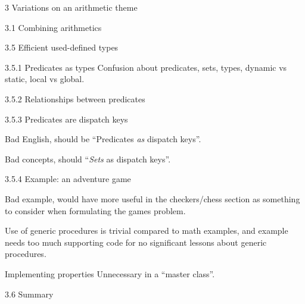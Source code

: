 \documentclass[12pt]{PalisadesLakesBook}
\begin{document}
\begin{plSection}{3 Variations on an arithmetic theme}
\begin{plSection}{3.1 Combining arithmetics}
\begin{plSection}{3.5 Efficient used-defined types}
\begin{plSection}{3.5.1 Predicates as types}
Confusion about predicates, sets, types,
dynamic vs static,
local vs global.

\end{plSection}%
\begin{plSection}{3.5.2 Relationships between predicates}

\end{plSection}%
\begin{plSection}{3.5.3 Predicates are dispatch keys}
 
Bad English, should be ``Predicates \emph{as} dispatch keys''.

Bad concepts, should ``\emph{Sets} as dispatch keys''.
 
\end{plSection}%
\begin{plSection}{3.5.4 Example: an adventure game}
 
Bad example, would have more useful in the checkers/chess
section as something to consider when formulating the 
games problem.

Use of generic procedures is trivial compared
to math examples, and example needs too much supporting code
for no significant lessons about generic procedures.
 
\begin{plSection}{Implementing properties}
Unnecessary in a ``master class''.
\end{plSection}%
\end{plSection}%
\end{plSection}%
\begin{plSection}{3.6 Summary}
\end{plSection}%
\end{plSection}%
\end{plSection}%
\end{document}
